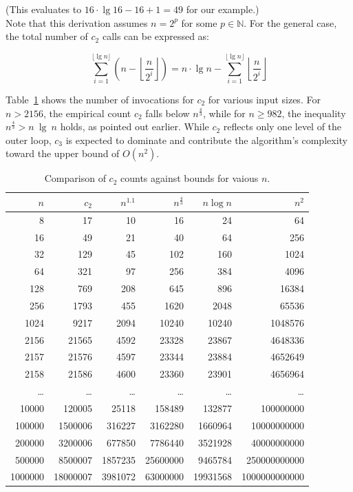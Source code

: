 \noindent
(This evaluates to $16 \cdot \lg 16 - 16 + 1 = 49$ for our example.)\\


Note that this derivation assumes $n = 2^p$ for some $p \in \mathbb{N}$.
For the general case, the total number of $c_2$ calls can be expressed as:

\[
    \sum_{i=1}^{\lfloor \lg n \rfloor} \left( n - \left\lfloor \frac{n}{2^i} \right\rfloor \right)
    = n \cdot \lg n - \sum_{i=1}^{\lfloor \lg n \rfloor} \left\lfloor \frac{n}{2^i} \right\rfloor
\]


Table~\ref{tab:counts} shows the number of invocations for $c_2$ for various input sizes.
For $n > 2156$, the empirical count $c_2$ falls below $n^\frac{4}{3}$, while for $n \geq 982$, the inequality $n^\frac{4}{3} > n\ \lg\ n$ holds, as pointed out earlier.
While $c_2$ reflects only one level of the outer loop, $c_3$ is expected to dominate and contribute the algorithm's complexity toward the upper bound of $O(n^2)$.

\begin{table}[h!]
    \centering
    \begin{tabular}{r|r|r|r|r|r}

        \textbf{$n$} & \textbf{$c_2$} & \textbf{$n^{1.1}$} & \textbf{$n^{\frac{4}{3}}$} & \textbf{$n \log n$} & \textbf{$n^2$} \\
        \hline
        8     & 17     & 10     & 16     & 24     & 64      \\
        16    & 49     & 21     & 40     & 64     & 256     \\
        32    & 129    & 45     & 102    & 160    & 1024    \\
        64    & 321    & 97     & 256    & 384    & 4096    \\
        128   & 769    & 208    & 645    & 896    & 16384   \\
        256   & 1793   & 455    & 1620   & 2048   & 65536   \\
        1024  & 9217   & 2094   & 10240  & 10240  & 1048576 \\
        2156  & 21565  & 4592   & 23328  & 23867  & 4648336 \\
        2157  & 21576  & 4597   & 23344  & 23884  & 4652649 \\
        2158  & 21586  & 4600   & 23360  & 23901  & 4656964 \\
        \ldots & \ldots & \ldots & \ldots & \ldots & \ldots \\
        10000 & 120005 & 25118  & 158489 & 132877 & 100000000 \\
        100000 & 1500006 & 316227 & 3162280 & 1660964 & 10000000000 \\
        200000 & 3200006 & 677850 & 7786440 & 3521928 & 40000000000 \\
        500000 & 8500007 & 1857235 & 25600000 & 9465784 & 250000000000 \\
        1000000 & 18000007 & 3981072 & 63000000 & 19931568 & 1000000000000 \\
        \hline
    \end{tabular}
    \smallskip
    \caption{Comparison of $c_2$ counts against bounds for vaious $n$.}
    \label{tab:counts}
\end{table}
